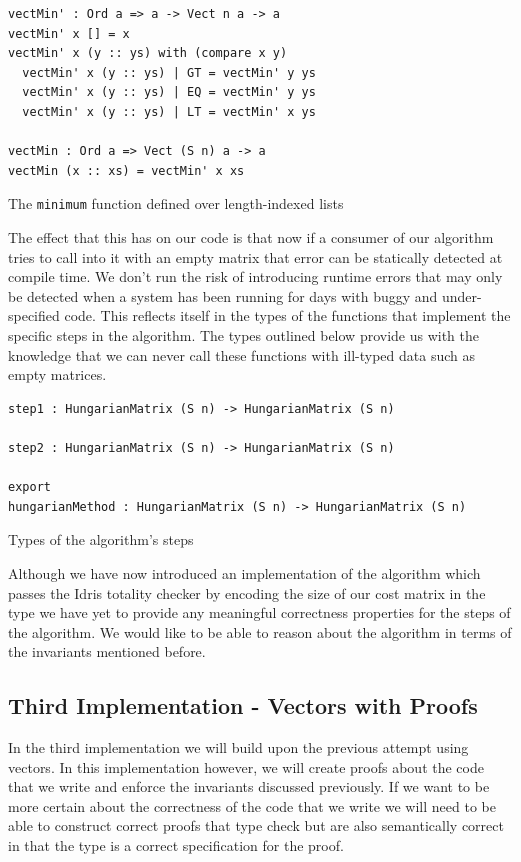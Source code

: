 \documentclass[a4paper, notitlepage]{report}
\begin{document}
\begin{listing}[H]
\begin{verbatim}
vectMin' : Ord a => a -> Vect n a -> a
vectMin' x [] = x
vectMin' x (y :: ys) with (compare x y)
  vectMin' x (y :: ys) | GT = vectMin' y ys
  vectMin' x (y :: ys) | EQ = vectMin' y ys
  vectMin' x (y :: ys) | LT = vectMin' x ys

vectMin : Ord a => Vect (S n) a -> a
vectMin (x :: xs) = vectMin' x xs
\end{verbatim}
\caption{The \texttt{minimum} function defined over length-indexed lists}
\end{listing}

The effect that this has on our code is that now if a consumer of our algorithm
tries to call into it with an empty matrix that error can be statically detected
at compile time. We don't run the risk of introducing runtime errors that may
only be detected when a system has been running for days with buggy and
under-specified code. This reflects itself in the types of the functions that
implement the specific steps in the algorithm. The types outlined below provide
us with the knowledge that we can never call these functions with ill-typed data
such as empty matrices.

\begin{listing}[H]
\begin{verbatim}
step1 : HungarianMatrix (S n) -> HungarianMatrix (S n)

step2 : HungarianMatrix (S n) -> HungarianMatrix (S n)

export
hungarianMethod : HungarianMatrix (S n) -> HungarianMatrix (S n)
\end{verbatim}
\caption{Types of the algorithm's steps}
\end{listing}

Although we have now introduced an implementation of the algorithm which passes
the Idris totality checker by encoding the size of our cost matrix in the type
we have yet to provide any meaningful correctness properties for the steps of
the algorithm. We would like to be able to reason about the algorithm in terms
of the invariants mentioned before.

\subsection{Third Implementation - Vectors with Proofs}
\label{sec:org43f097f}
In the third implementation we will build upon the previous attempt using
vectors. In this implementation however, we will create proofs about the code
that we write and enforce the invariants discussed previously. If we want to be
more certain about the correctness of the code that we write we will need to be
able to construct correct proofs that type check but are also semantically
correct in that the type is a correct specification for the proof.
\end{document}
